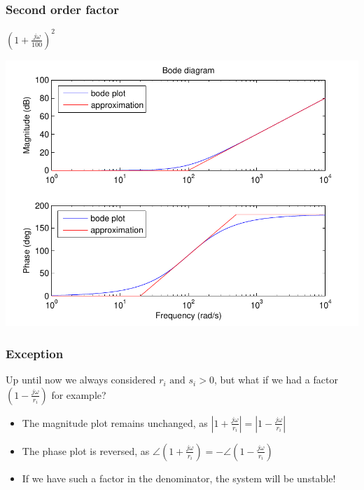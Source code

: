 \begin{frame}
\frametitle{Second order factor}
$(1+\frac{j\omega}{100})^2$

\begin{center}
\includegraphics[scale=0.5]{BodeSecondOrder}
\end{center}


\end{frame}


\begin{frame}
\frametitle{Exception}
Up until now we always considered $r_i \text{ and } s_i > 0$, but what if we had a factor $(1-\frac{j\omega}{r_i})$ for example?
\begin{itemize}
\item The magnitude plot remains unchanged, as $|1+\frac{j\omega}{r_i}| = |1 - \frac{j\omega}{r_i} |$
\item The phase plot is reversed, as $\angle(1+\frac{j\omega}{r_i}) = -\angle(1 - \frac{j\omega}{r_i})$
\item If we have such a factor in the denominator, the system will be unstable!
\end{itemize}

\end{frame}


